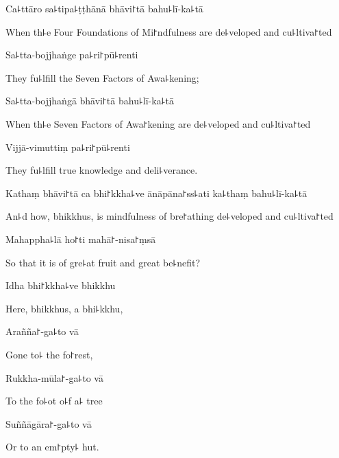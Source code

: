 Ca꜕ttāro sa꜕tipa꜕ṭṭhānā bhāvi꜓tā bahu꜕lī-ka꜕tā

\begin{english}
  When th꜕e Four Foundations of Mi꜓ndfulness are de꜕veloped and cu꜕ltiva꜓ted
\end{english}

Sa꜕tta-bojjhaṅge pa꜕ri꜓pū꜕renti

\begin{english}
  They fu꜕lfill the Seven Factors of Awa꜕kening;
\end{english}

Sa꜕tta-bojjhaṅgā bhāvi꜓tā bahu꜕lī-ka꜕tā

\begin{english}
  When th꜕e Seven Factors of Awa꜓kening are de꜕veloped and cu꜕ltiva꜓ted
\end{english}

Vijjā-vimuttiṃ pa꜕ri꜓pū꜕renti

\begin{english}
  They fu꜕lfill true knowledge and deli꜕verance.
\end{english}

Kathaṃ bhāvi꜓tā ca bhi꜓kkha꜕ve ānāpāna꜓ss꜕ati ka꜕thaṃ bahu꜕lī-ka꜕tā

\begin{english}
  An꜕d how, bhikkhus, is mindfulness of bre꜓athing de꜕veloped and cu꜕ltiva꜓ted
\end{english}

Mahappha꜕lā ho꜓ti mahā꜓-nisa꜓ṃsā

\begin{english}
  So that it is of gre꜕at fruit and great be꜕nefit?
\end{english}

Idha bhi꜓kkha꜕ve bhikkhu

\begin{english}
  Here, bhikkhus, a bhi꜕kkhu,
\end{english}

Arañña꜓-ga꜕to vā

\begin{english}
  Gone to꜕ the fo꜓rest,
\end{english}

Rukkha-mūla꜓-ga꜕to vā

\begin{english}
  To the fo꜕ot o꜕f a꜕ tree
\end{english}

Suññāgāra꜓-ga꜕to vā

\begin{english}
  Or to an em꜓pty꜕ hut.
\end{english}

